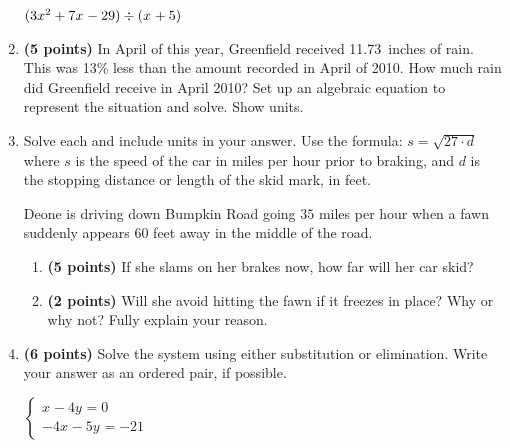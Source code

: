 \documentclass[12pt]{amsart}
\begin{document}
\begin{enumerate}
$(3x^{2}+7x^{}-29) \div (x^{}+5)$

\vfill  \vfill \vfill
\newpage\def \discount{13}\def \paid{1502.02}\def \rainy{11.73}\def \orcost{1726.46}\def \purcost{1329.22}\def \orrainy{13.48}
\item {\bf (5 points)} 
 In April of this year, Greenfield received \rainy\ inches of rain. This was \discount\% less than the amount recorded in April of 2010. How much rain did Greenfield  receive in April 2010? Set up an algebraic equation to represent the situation and solve. Show units.

\vfill 
\def \insvar{27}\def \d{60}\def \zerospeed{40.25}\def \slimit{35}\def \s{46}\def \skidd{78.37}\def \safed{45.37}\def \rsafed{45}

 
\item Solve each and include units in your answer. Use the formula: $s = \sqrt{\insvar \cdot d}$ where $s$ is the speed of the car in miles per hour prior to braking, and $d$ is the stopping distance or length of the skid mark, in feet. 

\vspace{3mm}

Deone is driving down Bumpkin Road going $\slimit$ miles per hour when a fawn suddenly appears $\d$ feet away in the middle of the road. \begin{enumerate}
\item {\bf (5 points)} If she slams on her brakes now, how far will her car skid? \vspace{4cm}
\item {\bf (2 points)} Will she avoid hitting the fawn if it freezes in place? Why or why not? Fully explain your reason. \vspace{3cm}
\end{enumerate}


\newpage\def \xis{4}\def \yis{1}\def \nomatcho{[3,5,2,3]}\def \a{3}\def \c{-5}\def \b{2}\def \d{3}\def \polyonesol{14}\def \polytwosol{-17}\def \xgoodone{3x^{}}\def \ygoodone{+2y^{}}\def \xgoodtwo{-5x^{}}\def \ygoodtwo{+3y^{}}\def \unitize{[1,0,0,0,1,0]}\def \mtem{2}\def \ntem{-4}\def \ptem{-4}\def \qtem{-5}\def \m{1}\def \n{-4}\def \p{-4}\def \q{-5}\def \polytonesol{0}\def \polyttwosol{-21}\def \xtgoodone{x^{}}\def \ytgoodone{-4y^{}}\def \xtgoodtwo{-4x^{}}\def \ytgoodtwo{-5y^{}}
\item {\bf (6 points)} 
 Solve the system using either substitution or elimination. Write your answer as an ordered pair, if possible. 

$ \begin{cases} \xtgoodone \ytgoodone = \polytonesol \\
\xtgoodtwo \ytgoodtwo = \polyttwosol
\end{cases}$


\end{enumerate}
\end{document}
